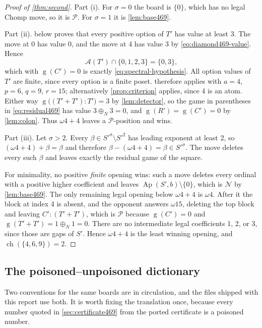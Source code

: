 \documentclass[11pt,letterpaper]{article}
\numberwithin{equation}{section}
\theoremstyle{definition}
\theoremstyle{remark}
\newcommand{\sg}{\operatorname{g}}
\newcommand{\opt}{\mathcal A}
\newcommand{\Ap}{\operatorname{Ap}}
\newcommand{\Pout}{\mathcal P}
\newcommand{\Nout}{\mathcal N}
\newcommand{\nimadd}{\mathbin{\oplus_{\!N}}}
\newcommand{\ch}{\operatorname{ch}}
\begin{document}
\begin{proof}[Proof of \cref{thm:second}]
Part (i). For $\sigma=0$ the board is $\{0\}$, which has no legal Chomp
move, so it is $\Pout$. For $\sigma=1$ it is \cref{lem:base469}.

Part (ii).  below proves that every positive option of
$T'$ has value at least 3. The move at 0 has value 0, and the move at 4
has value 3 by \cref{eq:diamond469-value}. Hence
\[
 \opt(T')\cap\{0,1,2,3\}=\{0,3\},
\]
which with $\sg(C')=0$ is exactly \cref{eq:spectral-hypothesis}. All
option values of $T'$ are finite, since every option is a finite poset.
 therefore applies with $a=4$, $p=6$, $q=9$,
$r=15$; alternatively \cref{prop:criterion} applies, since 4 is an atom.
Either way $\sg\bigl((T'+T'):T'\bigr)=3$ by \cref{lem:detector}, so the
game in parentheses in \cref{eq:residual469} has value
$3\nimadd3=0$, and $\sg(R')=\sg(C')=0$ by \cref{lem:colon}. Thus
$\omega4+4$ leaves a $\Pout$-position and wins.

Part (iii). Let $\sigma>2$. Every $\beta\in S'^{\sigma}\setminus S'^{2}$
has leading exponent at least 2, so $(\omega4+4)+\beta=\beta$ and
therefore $\beta-(\omega4+4)=\beta\in S'^{\sigma}$. The move deletes every
such $\beta$ and leaves exactly the residual game of the square.

For minimality, no positive \emph{finite} opening wins: such a move
deletes every ordinal with a positive higher coefficient and leaves
$\Ap(S',b)\setminus\{0\}$, which is $\Nout$ by \cref{lem:base469}. The
only remaining legal opening below $\omega4+4$ is $\omega4$. After it the
block at index 4 is absent, and the opponent answers $\omega15$, deleting
the top block and leaving $C':(T'+T')$, which is $\Pout$ because
$\sg(C')=0$ and $\sg(T'+T')=1\nimadd1=0$. There are no intermediate legal
coefficients 1, 2, or 3, since those are gaps of $S'$. Hence $\omega4+4$
is the least winning opening, and $\ch(\{4,6,9\})=2$.
\end{proof}

\subsection{The poisoned--unpoisoned dictionary}
\label{sec:dictionary}

Two conventions for the same boards are in circulation, and the files
shipped with this report use both. It is worth fixing the translation
once, because every number quoted in \cref{sec:certificate469} from the
ported certificate is a poisoned number.
\end{document}
